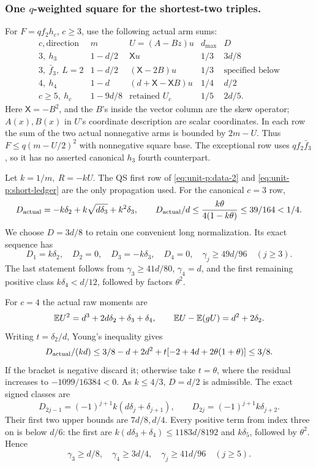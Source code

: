 \subsubsection{One \(q\)-weighted square for the shortest-two triples.}\label{part:unit-p:shortest-two}
For \(F=qf_2h_c\), \(c\ge3\), use the following actual arm sums:
\begin{equation}\label{eq:unit-p:data-24}
\begin{array}{c|c|c|c|c}
 c,\text{direction}&m&U=(A-Bz)u&d_{\max}&D\\\hline
 3,\ h_3&1-d/2&\mathsf Xu&1/3&3d/8\\
 3,\ \bar f_3,\ L=2&1-d/2&(\mathsf X-2B)u&1/3&
                         \text{specified below}\\
 4,\ h_4&1-d&(d+\mathsf X-\mathsf XB)u&1/4&d/2\\
 c\ge5,\ h_c&1-9d/8&\text{retained }U_c&1/5&2d/5 .
\end{array}
\end{equation}
Here \(\mathsf X=-B^2\), and the \(B\)'s inside the vector
column are the skew operator; \(A(x),B(x)\) in \(U\)'s coordinate
description are scalar coordinates.
In each row the sum of the two actual nonnegative arms is
bounded by \(2m-U\). Thus \(F\le q(m-U/2)^2\) with
nonnegative square base. The exceptional row uses \(qf_2\bar f_3\),
so it has no asserted canonical \(h_3\) fourth counterpart.

Let \(k=1/m,\ R=-kU\).
The QS first row of \eqref{eq:unit-p:data-2} and
\eqref{eq:unit-p:short-ledger} are the only propagation used.
For the canonical \(c=3\) row,
\[
 D_{\rm actual}=-k\delta_2+k\sqrt{d\delta_3}+k^2\delta_3,
 \qquad
 D_{\rm actual}/d\le\frac{k\theta}{4(1-k\theta)}
                    \le39/164<1/4 .
\]
We choose \(D=3d/8\) to retain one convenient long normalization.
Its exact sequence has
\begin{equation}\label{eq:unit-p:data-25}
D_1=k\delta_2,\quad D_2=0,\quad D_3=-k\delta_3,\quad D_4=0,
 \quad\gamma_j\ge49d/96\quad(j\ge3).
\end{equation}
The last statement follows from
\(\gamma_3\ge41d/80\), \(\gamma_4=d\), and the first remaining
positive class \(k\delta_4<d/12\), followed by factors \(\theta^2\).

For \(c=4\) the actual raw moments are
\[
 \mathbb E U^2=d^3+2d\delta_2+\delta_3+\delta_4,\qquad
 \mathbb E U-\mathbb E(gU)=d^2+2\delta_2.
\]
Writing \(t=\delta_2/d\), Young's inequality gives
\[
 D_{\rm actual}/(kd)\le
 3/8-d+2d^2+t[-2+4d+2\theta(1+\theta)]\le3/8.
\]
If the bracket is negative discard it; otherwise take \(t=\theta\),
where the residual increases to \(-1099/16384<0\).
As \(k\le4/3\), \(D=d/2\) is admissible.
The exact signed classes are
\[
 D_{2j-1}=(-1)^{j+1}k(d\delta_j+\delta_{j+1}),\qquad
 D_{2j}=(-1)^{j+1}k\delta_{j+2}.
\]
Their first two upper bounds are \(7d/8,d/4\).
Every positive term from index three on is below \(d/6\):
the first are \(k(d\delta_3+\delta_4)\le1183d/8192\)
and \(k\delta_5\), followed by \(\theta^2\).
Hence
\begin{equation}\label{eq:unit-p:data-26}
\gamma_3\ge d/8,\quad\gamma_4\ge3d/4,\quad
 \gamma_j\ge41d/96\quad(j\ge5).
\end{equation}

